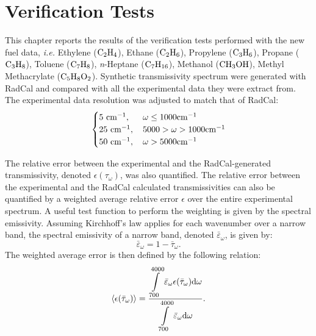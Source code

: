 

\chapter{Verification Tests}
\label{sec:verification}

This chapter reports the results of the verification tests performed with the new fuel data, \textit{i.e.} Ethylene ($\rm C_2H_4$), Ethane ($\rm C_2H_6$), Propylene ($\rm C_3H_6$), Propane ($\rm C_3H_8$), Toluene ($\rm C_7H_8$),
  \textit{n}-Heptane ($\rm C_7H_{16}$), Methanol ($\rm CH_3OH$), Methyl Methacrylate ($\rm C_5H_8O_2$). Synthetic transmissivity spectrum were generated with RadCal and compared with all the experimental data they were extract from. The experimental data resolution was adjusted to match that of RadCal:
\begin{equation}
 \begin{cases}
   5~{\rm cm}^{-1},\, & \omega \leq 1000 {\rm cm^{-1}}\\
    25~{\rm cm}^{-1},\,& 5000 > \omega > 1000 {\rm cm^{-1}} \\
    50~{\rm cm}^{-1},\,& \omega > 5000 {\rm cm^{-1}}
 \end{cases}
\end{equation}

The relative error between the experimental and the RadCal-generated transmissivity, denoted $\epsilon{(\tau_{\omega})}$, was also quantified. The relative error between the experimental and the RadCal calculated transmissivities can also be quantified by a weighted average relative error $\epsilon$ over the entire experimental spectrum. A useful test function to perform the weighting is given by the spectral emissivity. Assuming Kirchhoff's law applies for each wavenumber over a narrow band, the spectral emissivity of a narrow band, denoted $\bar{\varepsilon}_{\omega}$, is given by:
\begin{equation}
 \bar{\varepsilon}_{\omega} = 1 -\bar{\tau}_{\omega}.
\end{equation}
The weighted average error is then defined by the following relation:
\begin{equation}
\label{eq:WeightedError}
 \langle\epsilon{(\bar{\tau}_{\omega})}\rangle = \dfrac{\displaystyle\int\limits_{700}^{4000}\bar{\varepsilon}_{\omega}\epsilon(\bar{\tau}_{\omega}) {\rm d} \omega}{\displaystyle\int\limits_{700}^{4000}\bar{\varepsilon}_{\omega} {\rm d} \omega}.
\end{equation}


